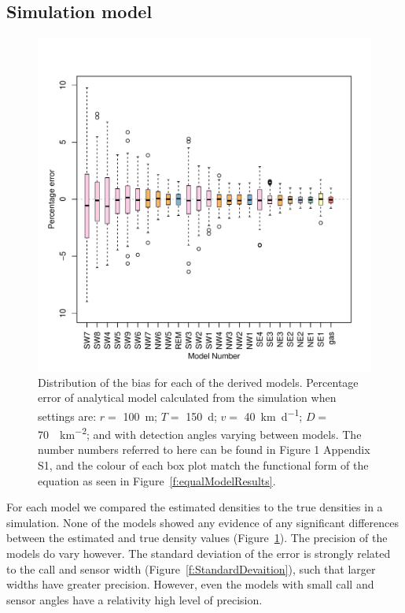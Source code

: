 \documentclass[a4paper,10pt,reqno,oneside]{amsart}
\begin{document}
\subsection{Simulation model}

\begin{figure}
	\centering
	\includegraphics[width=1\textwidth]{imgs/AverageModelBias.pdf}
	\caption{Distribution of the bias for each of the derived models. Percentage error of analytical model calculated from the simulation when settings are: $r = $ \SI{100}{\meter}; $T = $ \SI{150}{\day}; $v = $ \SI{40}{\kilo\meter\per\day}; $D = $ \SI{70}{\animals\per\kilo\meter\squared}; and with detection angles varying between models. The number numbers referred to here can be found in Figure 1 Appendix S1, and the colour of each box plot match the functional form of the equation as seen in Figure~\ref{f:equalModelResults}.
  }
	\label{f:ModelBias}
\end{figure}

For each model we compared the estimated densities to the true densities in a simulation. None of the models showed any evidence of any significant differences between the estimated and true density values (Figure~\ref{f:ModelBias}). The precision of the models do vary however. The standard deviation of the error is strongly related to the call and sensor width (Figure~\ref{f:StandardDevaition}), such that larger widths have greater precision. However, even the models with small call and sensor angles have a relativity high level of precision. 
\end{document}
